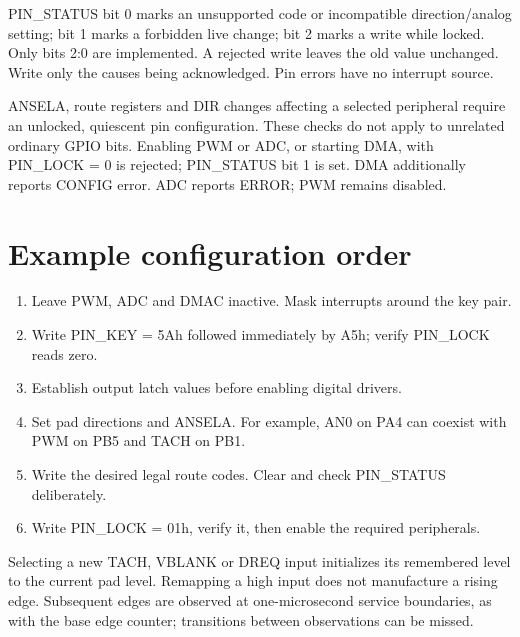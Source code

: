 \documentclass[10pt]{article}
\begin{document}
PIN\_STATUS bit 0 marks an unsupported code or incompatible direction/analog setting; bit 1 marks a forbidden live change; bit 2 marks a write while locked. Only bits 2:0 are implemented. A rejected write leaves the old value unchanged. Write only the causes being acknowledged. Pin errors have no interrupt source.

ANSELA, route registers and DIR changes affecting a selected peripheral require an unlocked, quiescent pin configuration. These checks do not apply to unrelated ordinary GPIO bits. Enabling PWM or ADC, or starting DMA, with PIN\_LOCK = 0 is rejected; PIN\_STATUS bit 1 is set. DMA additionally reports CONFIG error. ADC reports ERROR; PWM remains disabled.
\section*{Example configuration order}
\begin{enumerate}[leftmargin=1.5em,itemsep=3pt]
\item Leave PWM, ADC and DMAC inactive. Mask interrupts around the key pair.
\item Write PIN\_KEY = 5Ah followed immediately by A5h; verify PIN\_LOCK reads zero.
\item Establish output latch values before enabling digital drivers.
\item Set pad directions and ANSELA. For example, AN0 on PA4 can coexist with PWM on PB5 and TACH on PB1.
\item Write the desired legal route codes. Clear and check PIN\_STATUS deliberately.
\item Write PIN\_LOCK = 01h, verify it, then enable the required peripherals.
\end{enumerate}
Selecting a new TACH, VBLANK or DREQ input initializes its remembered level to the current pad level. Remapping a high input does not manufacture a rising edge. Subsequent edges are observed at one-microsecond service boundaries, as with the base edge counter; transitions between observations can be missed.
\vfill{}
\end{document}
